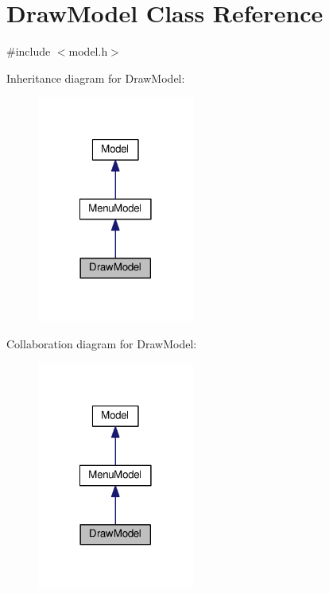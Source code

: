 \hypertarget{classDrawModel}{\section{Draw\-Model Class Reference}
\label{classDrawModel}
}


{\ttfamily \#include $<$model.\-h$>$}



Inheritance diagram for Draw\-Model\-:
\nopagebreak
\begin{figure}[H]
\begin{center}
\leavevmode
\includegraphics[width=146pt]{classDrawModel__inherit__graph}
\end{center}
\end{figure}


Collaboration diagram for Draw\-Model\-:
\nopagebreak
\begin{figure}[H]
\begin{center}
\leavevmode
\includegraphics[width=146pt]{classDrawModel__coll__graph}
\end{center}
\end{figure}
